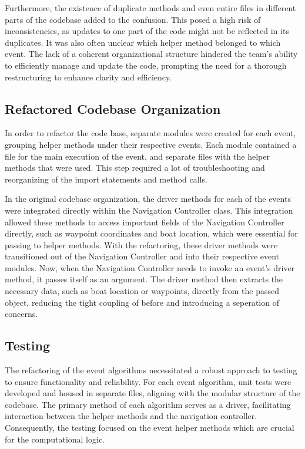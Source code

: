 \documentclass{article}
\begin{document}
Furthermore, the existence of duplicate methods and even entire files in different parts of the codebase added to the confusion. This  posed a high risk of inconsistencies, as updates to one part of the code might not be reflected in its duplicates. It was also often unclear which helper method belonged to which event. The lack of a coherent organizational structure hindered the team's ability to efficiently manage and update the code, prompting the need for a thorough restructuring to enhance clarity and efficiency.

\subsection{Refactored Codebase Organization}
In order to refactor the code base, separate modules were created for each event, grouping helper methods under their respective events. Each module contained a file for the main execution of the event, and separate files with the helper methods that were used. This step required a lot of troubleshooting and reorganizing of the import statements and method calls. 

In the original codebase organization, the driver methods for each of the events were integrated directly within the Navigation Controller class. This integration allowed these methods to access important fields of the Navigation Controller directly, such as waypoint coordinates and boat location, which were essential for passing to helper methods. With the refactoring, these driver methods were transitioned out of the Navigation Controller and into their respective event modules. Now, when the Navigation Controller needs to invoke an event’s driver method, it passes itself as an argument. The driver method then extracts the necessary data, such as boat location or waypoints, directly from the passed object, reducing the tight coupling of before and introducing a seperation of concerns. 

\subsection{Testing}
The refactoring of the event algorithms necessitated a robust approach to testing to ensure functionality and reliability. For each event algorithm, unit tests were developed and housed in separate files, aligning with the modular structure of the codebase. The primary method of each algorithm serves as a driver, facilitating interaction between the helper methods and the navigation controller. Consequently, the testing focused on the event helper methods which are crucial for the computational logic.
\end{document}
